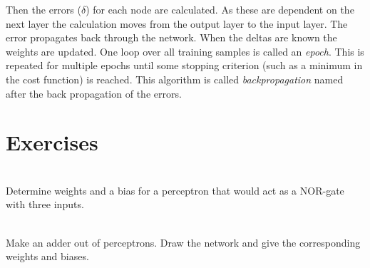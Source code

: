 Then the errors ($\delta$) for each node are calculated. As these are dependent on the next layer the calculation moves from the output layer to the input layer. The error propagates back through the network. When the deltas are known the weights are updated. One loop over all training samples is called an \textit{epoch}. This is repeated for multiple epochs until some stopping criterion (such as a minimum in the cost function) is reached. This algorithm is called \textit{backpropagation} named after the back propagation of the errors.

\section{Exercises}
\begin{exercise}~\label{ex:NOR-Gate}\\
Determine weights and a bias for a perceptron that would act as a NOR-gate with three inputs.

\end{exercise}

\begin{exercise}~\label{ex:ADDER}\\
Make an adder out of perceptrons. Draw the network and give the corresponding weights and biases.

\end{exercise}

%
%
%
%
%
%
%
%
%

